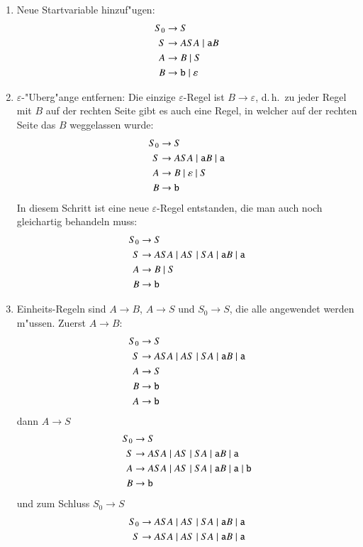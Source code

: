 \begin{enumerate}
\item Neue Startvariable hinzuf"ugen:
\begin{align*}
S_0&\to S\\
S&\to ASA\;|\; {\tt a}B\\
A&\to B\;|\; S\\
B&\to{\tt b}\;|\; \varepsilon
\end{align*}
\item $\varepsilon$-"Uberg"ange entfernen: Die einzige $\varepsilon$-Regel
ist $B\to\varepsilon$, d.\,h.~zu jeder Regel mit $B$ auf der rechten
Seite gibt es auch eine Regel, in welcher auf der rechten Seite das $B$
weggelassen wurde:
\begin{align*}
S_0&\to S\\
S&\to ASA\;|\; {\tt a}B\;|\;{\tt a}\\
A&\to B \;|\; \varepsilon \;|\; S\\
B&\to{\tt b}
\end{align*}
In diesem Schritt ist eine neue $\varepsilon$-Regel entstanden, die
man auch noch gleichartig behandeln muss:
\begin{align*}
S_0&\to S\\
S&\to ASA \;|\; AS \;|\; SA \;|\; {\tt a}B\;|\;{\tt a}\\
A&\to B \;|\; S\\
B&\to{\tt b}
\end{align*}
\item Einheits-Regeln sind $A\to B$, $A\to S$ und $S_0\to S$,
die alle angewendet werden
m"ussen. Zuerst $A\to B$:
\begin{align*}
S_0&\to S\\
S&\to ASA \;|\; AS \;|\; SA \;|\; {\tt a}B\;|\;{\tt a}\\
A&\to S\\
B&\to{\tt b}\\
A&\to{\tt b}
\end{align*}
dann $A\to S$
\begin{align*}
S_0&\to S\\
S&\to ASA \;|\; AS \;|\; SA \;|\; {\tt a}B\;|\;{\tt a}\\
A&\to ASA \;|\; AS \;|\; SA \;|\; {\tt a}B\;|\;{\tt a}\;|\;{\tt b}\\
B&\to{\tt b}
\end{align*}
und zum Schluss $S_0\to S$
\begin{align*}
S_0&\to ASA \;|\; AS \;|\; SA \;|\; {\tt a}B\;|\;{\tt a}\\
S&\to ASA \;|\; AS \;|\; SA \;|\; {\tt a}B\;|\;{\tt a}\\

\end{align*}
\end{enumerate}
